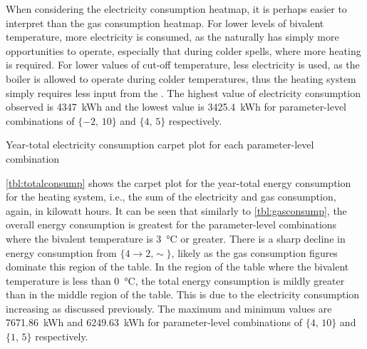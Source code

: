 When considering the electricity consumption heatmap, it is perhaps easier to interpret than the gas consumption heatmap. For lower levels of bivalent temperature, more electricity is consumed, as the \HP naturally has simply more opportunities to operate, especially that during colder spells, where more heating is required. For lower values of cut-off temperature, less electricity is used, as the boiler is allowed to operate during colder temperatures, thus the heating system simply requires less input from the \HP. The highest value of electricity consumption observed is \qty{4347}{\kWh} and the lowest value is \qty{3425.4}{\kWh} for parameter-level combinations of $\{-2\text{, }10\}$ and $\{4\text{, }5\}$ respectively. 

\begin{table}[htb]
    \footnotesize
    \centering
    \caption{Year-total electricity consumption carpet plot for each parameter-level combination}
    \label{tbl:elecconsump}
\end{table}

\cref{tbl:totalconsump} shows the carpet plot for the year-total energy consumption for the heating system, i.e., the sum of the electricity and gas consumption, again, in kilowatt hours. It can be seen that similarly to \cref{tbl:gasconsump}, the overall energy consumption is greatest for the parameter-level combinations where the bivalent temperature is \qty{3}{\celsius} or greater. There is a sharp decline in energy consumption from $\{4\rightarrow2\text{,}\sim\}$, likely as the gas consumption figures dominate this region of the table. In the region of the table where the bivalent temperature is less than \qty{0}{\celsius}, the total energy consumption is mildly greater than in the middle region of the table. This is due to the electricity consumption increasing as discussed previously. The maximum and minimum values are \qty{7671.86}{\kWh} and \qty{6249.63}{\kWh} for parameter-level combinations of $\{4\text{, }10\}$ and $\{1\text{, }5\}$ respectively. 

